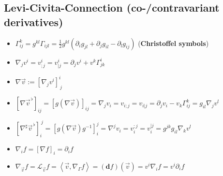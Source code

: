 \documentclass{scrartcl}
\newcommand{\exd}{\mathbf{d}}
\newcommand{\vecflat}[1]{\vec{#1}^{\,\flat}}
\renewcommand{\L}{\mathbf{\mathcal{L}}}
\begin{document}
    \subsection{Levi-Civita-Connection (co-/contravariant derivatives)}
      \begin{itemize}
        \item \( \Gamma_{ij}^{k} = g^{kl}\Gamma_{ijl} = \frac{1}{2}g^{kl}
              \left( \partial_{i}g_{jl} + \partial_{j}g_{il} - \partial_{l}g_{ij} \right) \)
           (\textbf{Christoffel symbols})
        \item \( \nabla_{j}v^{i} = v^{i}_{;j} = v^{i}_{|j} = \partial_{j}v^{i} + v^{k}\Gamma_{jk}^{i} \)
        \item \( \nabla \vec{v} := \left[ \nabla_{j}v^{i} \right]^{i}_{\ j} \)
        \item \( \left[ \nabla\vecflat{v} \right]_{ij} 
                      = \left[ g\left(\nabla\vec{v}\right) \right]_{ij}
                      = \nabla_{j}v_{i} = v_{i;j} = v_{i|j} = \partial_{j}v_{i} - v_{k}\Gamma_{ij}^{k} 
                      = g_{il}\nabla_{j}v^{l}\)
        \item \( \left[ \nabla^{\sharp}\vecflat{v} \right]_{i}^{\ j} 
                      = \left[ g\left(\nabla\vec{v}\right)g^{-1} \right]_{i}^{j}
                      = \nabla^{j}v_{i} = v_{i}^{;j} = v_{i}^{|j} 
                      = g^{jk}g_{il}\nabla_{k}v^{l}\)
        \item \( \nabla_{i}f = \left[ \nabla f \right]_{i} = \partial_{i}f \)
        \item \( \nabla_{\vec{v}}f = \L_{\vec{v}}f= \left\langle \vec{v}, \nabla_{\Gamma}f \right\rangle
                  = (\exd f)(\vec{v}) = v^{i}\nabla_{i}f = v^{i}\partial_{i}f \)
      \end{itemize}
\end{document}
